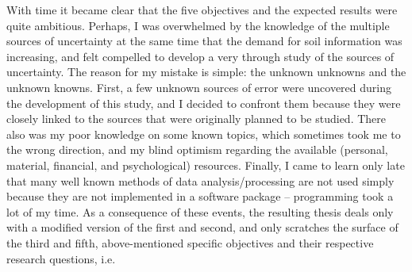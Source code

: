 With time it became clear that the five objectives and the expected results were quite ambitious. 
Perhaps, I was overwhelmed by the knowledge of the multiple sources of uncertainty at the same time 
that the demand for soil information was increasing, and felt compelled to develop a very through 
study of the sources of uncertainty. The reason for my mistake is simple: the unknown unknowns and
the unknown knowns. First, a few unknown sources of error were uncovered during the development of 
this study, and I decided to confront them because they were closely linked to the sources that were
originally planned to be studied. There also was my poor knowledge on some known topics, which 
sometimes took me to the wrong direction, and my blind optimism regarding the available (personal, 
material, financial, and psychological) resources. Finally, I came to learn only late that many 
well known methods of data analysis/processing are not used simply because they are not implemented
in a software package -- programming took a lot of my time. As a consequence of these events, the 
resulting thesis deals only with a modified version of the first and second, and only scratches 
the surface of the third and fifth, above-mentioned specific objectives and their respective 
research questions, i.e.

